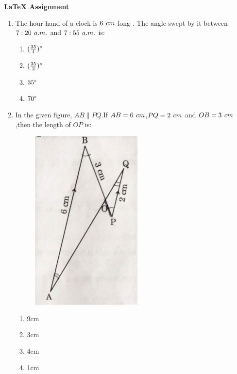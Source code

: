 \documentclass{article}
\begin{document}
\begin{center}
    \textbf{ \LaTeX{} Assignment}
\end{center}

\begin{enumerate}
    \item The hour-hand of a clock is $6 \hspace{4 pt} cm$ long . The angle swept by it between $7:20 \hspace{4 pt} a.m.$ and $7:55 \hspace{4 pt} a.m.$ is:

\begin{enumerate}[label=(\alph*)]
    \item $(\frac{35}{4})\degree$
    \item $(\frac{35}{2})\degree$
    \item $35\degree$
   \item $70\degree$
\end{enumerate}

\item In the given figure, $ AB \parallel PQ $.If $AB=6\hspace{4 pt}cm$,$PQ=2\hspace{4 pt} cm$ and $OB=3\hspace{4 pt}cm$,then the length of $OP$ is:

\begin{figure}[h]
    \centering
    \includegraphics[width=5 cm]{30_2_1_Q18}
    \caption{}
    \label{fig:30_2_1_Q18}
\end{figure}
\begin{enumerate}[label=(\alph*)]
    \item 9cm
    \item 3cm
    \item 4cm 
    \item 1cm
\end{enumerate}


\end{enumerate}
\end{document}
